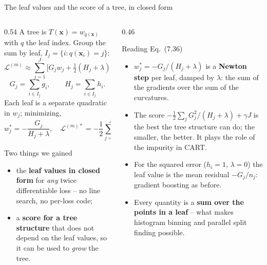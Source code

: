 \documentclass[10pt,aspectratio=169]{beamer}
\begin{document}
\begin{frame}{The leaf values and the score of a tree, in closed form}
\begin{columns}[T]
\begin{column}{0.54\textwidth}
\footnotesize
A tree is $T(\bm{x})=w_{q(\bm{x})}$ with $q$ the leaf index.  Group the sum
by leaf, $I_j=\{i:q(\bm{x}_i)=j\}$:
\[
\mathcal{L}^{(m)}\approx\sum_{j=1}^J\Big[G_jw_j+\tfrac12(H_j+\lambda)w_j^2\Big]+\gamma J,\tag{7.35}
\]
\[
G_j=\sum_{i\in I_j}g_i,\qquad H_j=\sum_{i\in I_j}h_i .
\]
Each leaf is a separate quadratic in $w_j$; minimizing,
\[
w_j^*=-\frac{G_j}{H_j+\lambda},\quad
\mathcal{L}^{(m)*}=-\frac12\sum_{j=1}^J\frac{G_j^2}{H_j+\lambda}+\gamma J .\tag{7.36}
\]
\begin{block}{Two things we gained}
\begin{itemize}
  \item the \textbf{leaf values in closed form} for \emph{any} twice
    differentiable loss -- no line search, no per-loss code;
  \item a \textbf{score for a tree structure} that does not depend on the
    leaf values, so it can be used to \emph{grow} the tree.
\end{itemize}
\end{block}
\end{column}
\begin{column}{0.46\textwidth}
\begin{block}{Reading Eq.\ (7.36)}
\footnotesize
\begin{itemize}
  \item $w_j^*=-G_j/(H_j+\lambda)$ is a \textbf{Newton step} per leaf, damped
    by $\lambda$: the sum of the gradients over the sum of the curvatures.
  \item The score $-\frac12\sum_jG_j^2/(H_j+\lambda)+\gamma J$ is the best
    the tree structure can do; the smaller, the better.  It plays the role
    of the impurity in CART.
  \item For the squared error ($h_i=1$, $\lambda=0$) the leaf value is the
    mean residual $-G_j/n_j$: gradient boosting as before.
  \item Every quantity is a \textbf{sum over the points in a leaf} -- what
    makes histogram binning and parallel split finding possible.
\end{itemize}
\end{block}
\end{column}
\end{columns}
\end{frame}
\end{document}
